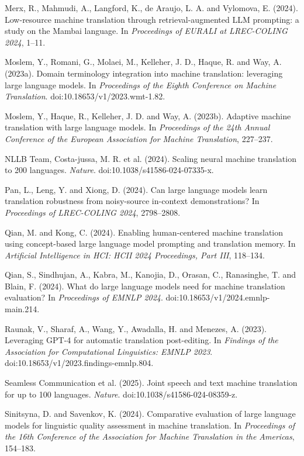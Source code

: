 \documentclass[11pt]{article}
\begin{document}
Merx, R., Mahmudi, A., Langford, K., de Araujo, L. A. and Vylomova, E. (2024). Low-resource machine translation through retrieval-augmented LLM prompting: a study on the Mambai language. In \emph{Proceedings of EURALI at LREC-COLING 2024}, 1--11.

Moslem, Y., Romani, G., Molaei, M., Kelleher, J. D., Haque, R. and Way, A. (2023a). Domain terminology integration into machine translation: leveraging large language models. In \emph{Proceedings of the Eighth Conference on Machine Translation}. doi:10.18653/v1/2023.wmt-1.82.

Moslem, Y., Haque, R., Kelleher, J. D. and Way, A. (2023b). Adaptive machine translation with large language models. In \emph{Proceedings of the 24th Annual Conference of the European Association for Machine Translation}, 227--237.

NLLB Team, Costa-jussa, M. R. et al. (2024). Scaling neural machine translation to 200 languages. \emph{Nature}. doi:10.1038/s41586-024-07335-x.

Pan, L., Leng, Y. and Xiong, D. (2024). Can large language models learn translation robustness from noisy-source in-context demonstrations? In \emph{Proceedings of LREC-COLING 2024}, 2798--2808.

Qian, M. and Kong, C. (2024). Enabling human-centered machine translation using concept-based large language model prompting and translation memory. In \emph{Artificial Intelligence in HCI: HCII 2024 Proceedings, Part III}, 118--134.

Qian, S., Sindhujan, A., Kabra, M., Kanojia, D., Orasan, C., Ranasinghe, T. and Blain, F. (2024). What do large language models need for machine translation evaluation? In \emph{Proceedings of EMNLP 2024}. doi:10.18653/v1/2024.emnlp-main.214.

Raunak, V., Sharaf, A., Wang, Y., Awadalla, H. and Menezes, A. (2023). Leveraging GPT-4 for automatic translation post-editing. In \emph{Findings of the Association for Computational Linguistics: EMNLP 2023}. doi:10.18653/v1/2023.findings-emnlp.804.

Seamless Communication et al. (2025). Joint speech and text machine translation for up to 100 languages. \emph{Nature}. doi:10.1038/s41586-024-08359-z.

Sinitsyna, D. and Savenkov, K. (2024). Comparative evaluation of large language models for linguistic quality assessment in machine translation. In \emph{Proceedings of the 16th Conference of the Association for Machine Translation in the Americas}, 154--183.
\end{document}
